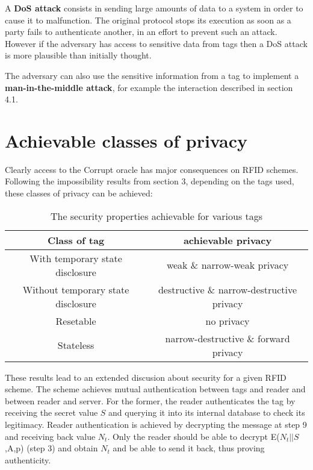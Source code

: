     A \textbf{DoS attack} consists in sending large amounts of data to a system in order to cause it to malfunction. The original protocol
    stops its execution as soon as a party fails to authenticate another, in an effort to prevent such an attack. However if the adversary 
    has access to sensitive data from tags then a DoS attack is more plausible than initially thought.

    The adversary can also use the sensitive information from a tag to implement a \textbf{man-in-the-middle attack}, for example the 
    interaction described in section 4.1.

\section{Achievable classes of privacy}

    Clearly access to the Corrupt oracle has major consequences on RFID schemes. Following the impossibility results from section 3, 
    depending on the tags used, these classes of privacy can be achieved:

    \begin{table}[H]
    \centering
    \caption{The security properties achievable for various tags}
    \begin{tabular}{| c | c |}
        \hline
        Class of tag & achievable privacy \\
        \hline
        With temporary state disclosure & weak \& narrow-weak privacy\\
        Without temporary state disclosure & destructive \& narrow-destructive privacy\\
        Resetable & no privacy \\
        Stateless & narrow-destructive \& forward privacy \\
        \hline
    \end{tabular}
    \end{table}

    These results lead to an extended discusion about security for a given RFID scheme. The \cite{BOM} scheme achieves mutual
    authentication between tags and reader and between reader and server. For the former, the reader authenticates the tag by
    receiving the secret value $S$ and querying it into its internal database to check its legitimacy. Reader authentication is
    achieved by decrypting the message at step 9 and receiving back value $N_t$. Only the reader should be able to decrypt 
    E($N_t||S$,A,p) (step 3) and obtain $N_t$ and be able to send it back, thus proving authenticity.
    
